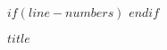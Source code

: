 \doublespacing

$if(line-numbers)$
\linenumbers
$endif$

\begin{flushleft}


\Large{
  \textbf{$title$}
}

\end{flushleft}

